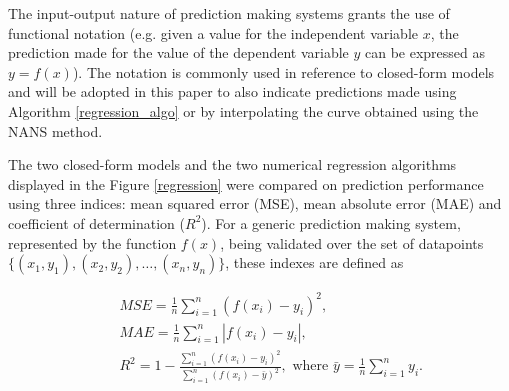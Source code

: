 \documentclass[10pt,final]{siamltex}
\begin{document}
The input-output nature of prediction making systems grants the use of functional notation (e.g. given a value for the independent variable $x$, the prediction made for the value of the dependent variable $y$ can be expressed as $y = f(x)$).
The notation is commonly used in reference to closed-form models and will be adopted in this paper to also indicate predictions made using Algorithm \ref{regression_algo} or by interpolating the curve obtained using the NANS method.

The two closed-form models and the two numerical regression algorithms displayed in the Figure \ref{regression} were compared on prediction performance using three indices: mean squared error (MSE), mean absolute error (MAE) and coefficient of determination ($R^2$).
For a generic prediction making system, represented by the function $f(x)$, being validated over the set of datapoints $\lbrace(x_1,y_1), (x_2,y_2), \ldots, (x_n,y_n)\rbrace$, these indexes are defined as

\begin{eqnarray}
  &&\textit{MSE} = \frac{1}{n}\sum_{i=1}^{n}{(f(x_i)-y_i)^2},\\
  &&\textit{MAE} = \frac{1}{n}\sum_{i=1}^{n}{|f(x_i)-y_i|},\\
  &&R^2 = 1 - \frac{\sum_{i=1}^{n}{(f(x_i)-y_i)^2}}{\sum_{i=1}^{n}{(f(x_i)-\bar{y})^2}},
  \text{ where } \bar{y} = \frac{1}{n}\sum_{i=1}^{n}{y_i}.
\end{eqnarray}
\end{document}

